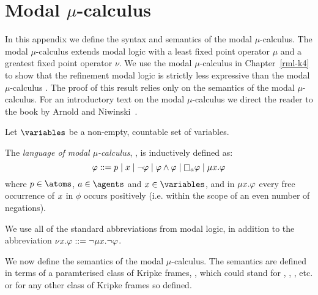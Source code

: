 \chapter{Modal $\mu$-calculus}\label{mu}

In this appendix we define the syntax and semantics of the modal $\mu$-calculus.
The modal $\mu$-calculus extends modal logic with a least fixed point operator $\mu$ and a greatest fixed point operator $\nu$.
We use the modal $\mu$-calculus in Chapter~\ref{rml-k4} to show that the refinement modal logic \logicRmlKF{} is strictly less expressive than the modal $\mu$-calculus \logicMuKF{}.
The proof of this result relies only on the semantics of the modal $\mu$-calculus.
For an introductory text on the modal $\mu$-calculus we direct the reader to the book by Arnold and Niwinski~\cite{arnold:2001}.

Let $\variables$ be a non-empty, countable set of variables.

\begin{definition}
The {\em language of modal $\mu$-calculus}, \langMu{}, is inductively defined as:
$$
\phi ::= 
    \atomP \mid
    \varX \mid
    \lnot \phi \mid
    \phi \land \phi \mid
    \necessaryA \phi \mid
    \lfpX \phi
$$
where $\atomP \in \atoms$, $\agentA \in \agents$ and $\varX \in \variables$, and in $\mu {x} . \varphi$ every free occurrence of $x$ in $\phi$ occurs positively (i.e. within the scope of an even number of negations).
\end{definition}

We use all of the standard abbreviations from modal logic, in addition to the abbreviation $\nu {x} . \varphi ::= \lnot \mu {x} . \lnot \varphi$.

We now define the semantics of the modal $\mu$-calculus.
The semantics are defined in terms of a paramterised class of Kripke frames, \classC{}, which could stand for \classK{}, \classKF{}, \classKFF{}, etc. or for any other class of Kripke frames so defined.

